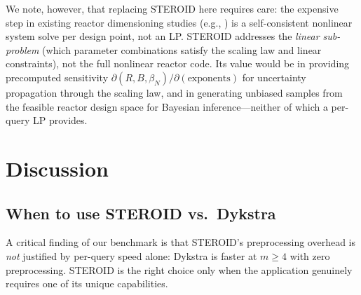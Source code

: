 \documentclass[review,onefignum,onetabnum]{./SIAM_template/siamart171218}
\begin{document}
We note, however, that replacing STEROID here requires care: the expensive step in
existing reactor dimensioning studies (e.g., \cite{Sarazin2019}) is a self-consistent
nonlinear system solve per design point, not an LP.
STEROID addresses the
\emph{linear sub-problem} (which parameter combinations satisfy the scaling law and
linear constraints), not the full nonlinear reactor code.  Its value would be in
providing precomputed sensitivity $\partial(R, B, \beta_N) / \partial(\text{exponents})$
for uncertainty propagation through the scaling law, and in generating unbiased
samples from the feasible reactor design space for Bayesian inference---neither of
which a per-query LP provides.

\section{Discussion}
\label{sec:discussion}

\subsection{When to use STEROID vs.\ Dykstra}

A critical finding of our benchmark is that STEROID's preprocessing overhead is
\emph{not} justified by per-query speed alone: Dykstra is faster at $m \geq 4$
with zero preprocessing.  STEROID is the right choice only when the application
genuinely requires one of its unique capabilities.
\end{document}
